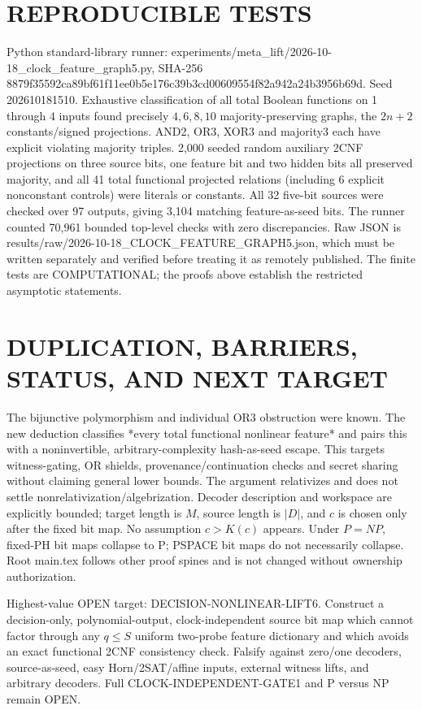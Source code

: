 \documentclass[11pt]{article}
\begin{document}
\section{REPRODUCIBLE TESTS}
Python standard-library runner: experiments/meta_lift/2026-10-18_clock_feature_graph5.py, SHA-256 8879f35592ca89bf61f11ee0b5e176c39b3cd00609554f82a942a24b3956b69d. Seed 202610181510. Exhaustive classification of all total Boolean functions on 1 through 4 inputs found precisely $4,6,8,10$ majority-preserving graphs, the $2n+2$ constants/signed projections. AND2, OR3, XOR3 and majority3 each have explicit violating majority triples. 2,000 seeded random auxiliary 2CNF projections on three source bits, one feature bit and two hidden bits all preserved majority, and all 41 total functional projected relations (including 6 explicit nonconstant controls) were literals or constants. All 32 five-bit sources were checked over 97 outputs, giving 3,104 matching feature-as-seed bits. The runner counted 70,961 bounded top-level checks with zero discrepancies. Raw JSON is results/raw/2026-10-18_CLOCK_FEATURE_GRAPH5.json, which must be written separately and verified before treating it as remotely published. The finite tests are COMPUTATIONAL; the proofs above establish the restricted asymptotic statements.

\section{DUPLICATION, BARRIERS, STATUS, AND NEXT TARGET}
The bijunctive polymorphism and individual OR3 obstruction were known. The new deduction classifies *every total functional nonlinear feature* and pairs this with a noninvertible, arbitrary-complexity hash-as-seed escape. This targets witness-gating, OR shields, provenance/continuation checks and secret sharing without claiming general lower bounds. The argument relativizes and does not settle nonrelativization/algebrization. Decoder description and workspace are explicitly bounded; target length is $M$, source length is $|D|$, and $c$ is chosen only after the fixed bit map. No assumption $c>K(c)$ appears. Under $P=NP$, fixed-PH bit maps collapse to P; PSPACE bit maps do not necessarily collapse. Root main.tex follows other proof spines and is not changed without ownership authorization.

Highest-value OPEN target: DECISION-NONLINEAR-LIFT6. Construct a decision-only, polynomial-output, clock-independent source bit map which cannot factor through any $q\le S$ uniform two-probe feature dictionary and which avoids an exact functional 2CNF consistency check. Falsify against zero/one decoders, source-as-seed, easy Horn/2SAT/affine inputs, external witness lifts, and arbitrary decoders. Full CLOCK-INDEPENDENT-GATE1 and P versus NP remain OPEN.
\end{document}
